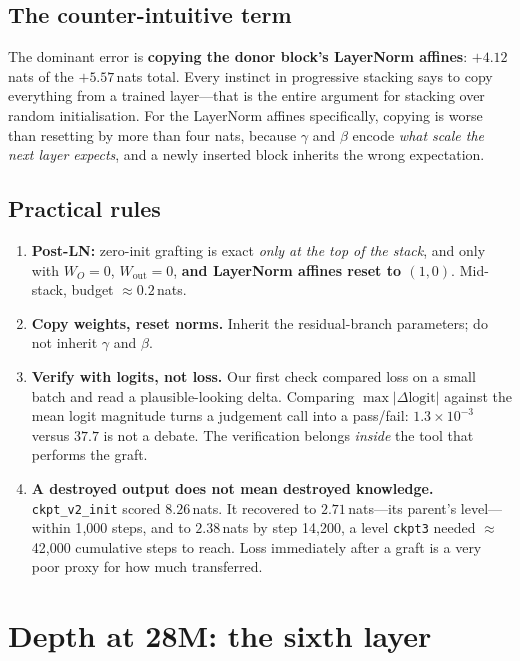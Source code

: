 \documentclass[11pt,a4paper]{article}
\newcommand{\WO}{\ensuremath{W_O}}
\newcommand{\nats}[1]{\ensuremath{#1}\,nats}
\begin{document}
\subsection{The counter-intuitive term}

The dominant error is \textbf{copying the donor block's LayerNorm affines}: \nats{{+}4.12} of
the \nats{{+}5.57} total. Every instinct in progressive stacking says to copy everything from a
trained layer---that is the entire argument for stacking over random initialisation. For the
LayerNorm affines specifically, copying is worse than resetting by more than four nats, because
$\gamma$ and $\beta$ encode \emph{what scale the next layer expects}, and a newly inserted
block inherits the wrong expectation.

\subsection{Practical rules}

\begin{enumerate}[label=(\alph*)]
\item \textbf{Post-LN:} zero-init grafting is exact \emph{only at the top of the stack}, and
only with $\WO = 0$, $W_\text{out} = 0$, \textbf{and LayerNorm affines reset to $(1,0)$}.
Mid-stack, budget $\approx$\nats{0.2}.
\item \textbf{Copy weights, reset norms.} Inherit the residual-branch parameters; do not
inherit $\gamma$ and $\beta$.
\item \textbf{Verify with logits, not loss.} Our first check compared loss on a small batch and
read a plausible-looking delta. Comparing $\max|\Delta\text{logit}|$ against the mean logit
magnitude turns a judgement call into a pass/fail: $1.3\times10^{-3}$ versus $37.7$ is not a
debate. The verification belongs \emph{inside} the tool that performs the graft.
\item \textbf{A destroyed output does not mean destroyed knowledge.} \texttt{ckpt\_v2\_init}
scored \nats{8.26}. It recovered to \nats{2.71}---its parent's level---within
1{,}000 steps, and to \nats{2.38} by step 14{,}200, a level \texttt{ckpt3} needed $\approx$42{,}000
cumulative steps to reach. Loss immediately after a graft is a very poor proxy for how much
transferred.
\end{enumerate}

\section{Depth at 28M: the sixth layer}\label{sec:depth}
\end{document}
